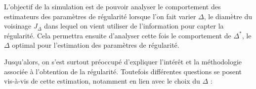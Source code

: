 L'objectif de la simulation est de pouvoir analyser le comportement des estimateurs des paramètres de régularité lorsque l'on fait varier $\Delta$, le diamètre du voisinage $J_\Delta$ dans lequel on vient utiliser de l'information pour capter la régularité. Cela permettra ensuite d'analyser cette fois le comportement de $\Delta^*$, le $\Delta$ optimal pour l'estimation des paramètres de régularité.

Jusqu'alors, on s'est surtout préoccupé d'expliquer l'intérêt et la méthodologie associée à l'obtention de la régularité. Toutefois différentes questions se posent vis-à-vis de cette estimation, notamment en lien avec le choix du $\Delta$ :

